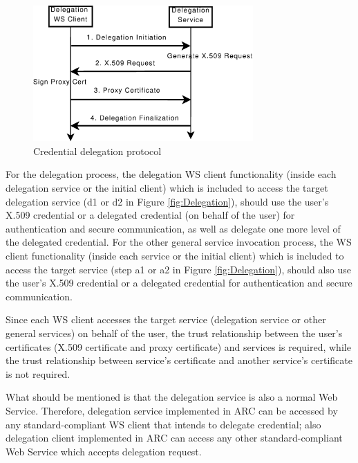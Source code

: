 \begin{figure}
\includegraphics[width=0.75\textwidth]{Delegation_protocol.eps}
\caption{Credential delegation protocol}
\label{fig:Delegation_protocol}
\end{figure}
For the delegation process, the delegation WS client functionality (inside each delegation service or the initial client) which is included to access the target delegation service (d1 or d2 in Figure \ref{fig:Delegation}), should use the user’s X.509 credential or a delegated credential (on behalf of the user) for authentication and secure communication, as well as delegate one more level of the delegated credential. For the other general  service invocation process, the WS client functionality (inside each service or the initial client) which is included to access the target service (step a1 or a2 in Figure \ref{fig:Delegation}), should also use the user’s X.509 credential or a delegated credential for authentication and secure communication.

Since each WS client accesses the target service (delegation service or other general services) on behalf of the user, the trust relationship between the user’s certificates (X.509 certificate and proxy certificate) and services is required, while the trust relationship between service’s certificate and another service’s certificate is not required.

What should be mentioned is that the delegation service is also a normal Web Service. Therefore, delegation service implemented in ARC can be accessed by any standard-compliant WS client that intends to delegate credential; also delegation client implemented in ARC can access any other standard-compliant Web Service which accepts delegation request.


